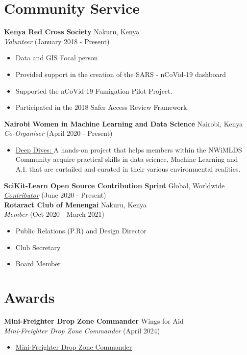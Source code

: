 \documentclass[line,margin,10pt]{res}
\begin{document}
\begin{resume}
\section{Community Service}
\textbf{Kenya Red Cross Society} \hfill Nakuru, Kenya\\
{\sl Volunteer} \hfill (January 2018 - Present)
\begin{itemize} \itemsep -2pt
    \item Data and GIS Focal person
    \item Provided support in the creation of the SARS - nCoVid-19 dashboard
    \item Supported the nCoVid-19 Fumigation Pilot Project.
    \item Participated in the 2018 Safer Access Review Framework.
\end{itemize}
\textbf{Nairobi Women in Machine Learning and Data Science} \hfill Nairobi, Kenya\\
{\sl Co-Organiser} \hfill (April 2020 - Present)
\begin{itemize} \itemsep -2pt
    \item \underline{Deep Dives: }
    A hands-on project that helps members within the NWiMLDS Community acquire practical skills in data science, Machine Learning and A.I. that are curtailed and curated in their various environmental realities.
\end{itemize}
\textbf{SciKit-Learn Open Source Contribution Sprint} \hfill Global, Worldwide\\
{\sl \href{https://sites.google.com/view/nyc-2020-scikit-sprint/contributors}{Contributor}} \hfill (June 2020 - Present) \\
\textbf{Rotaract Club of Menengai} \hfill Nakuru, Kenya\\
{\sl Member} \hfill (Oct 2020 - March 2021)
\begin{itemize} \itemsep -2pt
    \item Public Relations (P.R) and Design Director
    \item Club Secretary
    \item Board Member
\end{itemize}
{\vspace{-0,25cm}}

\section{Awards}
\textbf{Mini-Freighter Drop Zone Commander} \hfill Wings for Aid\\
{\sl Mini-Freighter Drop Zone Commander} \hfill (April 2024)
\begin{itemize} \itemsep -2pt
    \item \href{https://eu1.documents.adobe.com/public/agreements/view/CBJCHBCAABAAo6EysFkkqA1ey7U1NxoaUMuCQWBD2O_j?type=esign&tsid=CBFCIBAACBSCTBABDUAAABACAABAA8ODh1Bs2tN-cEUzSBNJroR8RWzTYY75BIhLtxFRDbIu8Jewrp6hgiaU25vKXNbO182DWtA--BTfJqve1kL8imSkgsNd0UarFi8_7LTvA0_COfTYD465w0IjtVBvhxc2Y}{Mini-Freighter Drop Zone Commander}
\end{itemize}


\end{resume}
\end{document}
